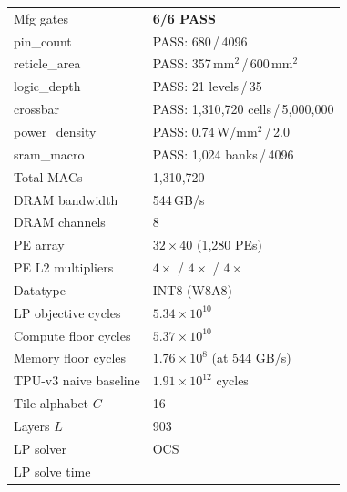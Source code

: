 \begin{table}[h]
\begin{tabular}{@{}ll@{}}
\midrule
Mfg gates               & \textcolor{green!60!black}{\textbf{6/6 PASS}} \\
\quad pin\_count         & PASS: 680\,/\,4096 \\
\quad reticle\_area      & PASS: 357\,mm$^2$\,/\,600\,mm$^2$ \\
\quad logic\_depth       & PASS: 21 levels\,/\,35 \\
\quad crossbar           & PASS: 1{,}310{,}720 cells\,/\,5{,}000{,}000 \\
\quad power\_density     & PASS: 0.74\,W/mm$^2$\,/\,2.0 \\
\quad sram\_macro        & PASS: 1{,}024 banks\,/\,4096 \\
\midrule
Total MACs              & 1{,}310{,}720 \\
DRAM bandwidth          & 544\,GB/s \\
DRAM channels           & 8 \\
PE array                & $32 \times 40$ (1{,}280 PEs) \\
PE L2 multipliers       & $4\times$ / $4\times$ / $4\times$ \\
Datatype                & INT8 (W8A8) \\
LP objective cycles     & $5.34 \times 10^{10}$ \\
Compute floor cycles    & $5.37 \times 10^{10}$ \\
Memory floor cycles     & $1.76 \times 10^{8}$ (at 544 GB/s) \\
TPU-v3 naive baseline   & $1.91 \times 10^{12}$ cycles \\
Tile alphabet $C$       & 16 \\
Layers $L$              & 903 \\
LP solver               & OCS \\
LP solve time           &  \\
\bottomrule
\end{tabular}
\end{table}

\clearpage
